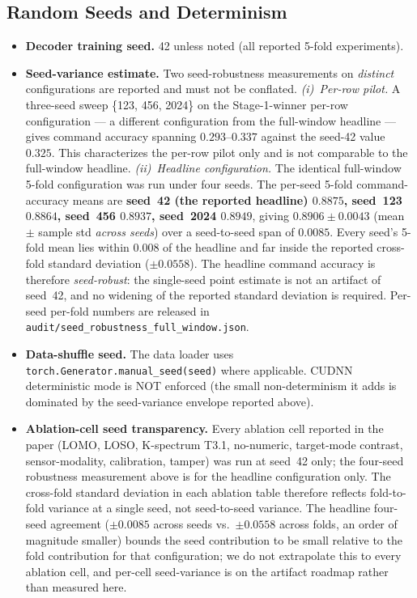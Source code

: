 \subsection{Random Seeds and Determinism}
\label{app:repl-seeds}

\begin{itemize}
\item \textbf{Decoder training seed.} 42 unless noted (all reported
5-fold experiments).
\item \textbf{Seed-variance estimate.} Two seed-robustness measurements
on \emph{distinct} configurations are reported and must not be
conflated. \emph{(i)~Per-row pilot.} A three-seed sweep \{123, 456,
2024\} on the Stage-1-winner per-row configuration --- a different
configuration from the full-window headline --- gives command accuracy
spanning $0.293$--$0.337$ against the seed-42 value $0.325$. This
characterizes the per-row pilot only and is not comparable to the
full-window headline. \emph{(ii)~Headline configuration.} The identical
full-window 5-fold configuration was run under four seeds. The per-seed
5-fold command-accuracy means are \textbf{seed~42 (the reported
headline) $0.8875$, seed~123 $0.8864$, seed~456 $0.8937$, seed~2024
$0.8949$}, giving $0.8906 \pm 0.0043$ (mean $\pm$ sample std
\emph{across seeds}) over a seed-to-seed span of $0.0085$. Every seed's
5-fold mean lies within $0.008$ of the headline and far inside the
reported cross-fold standard deviation ($\pm 0.0558$). The headline
command accuracy is therefore \emph{seed-robust}: the single-seed point
estimate is not an artifact of seed~42, and no widening of the reported
standard deviation is required. Per-seed per-fold numbers are released
in \texttt{audit/\allowbreak seed\_robustness\_full\_window.json}.
\item \textbf{Data-shuffle seed.} The data loader uses
\texttt{torch.Generator.manual\_seed(seed)} where applicable. CUDNN
deterministic mode is NOT enforced (the small non-determinism it adds
is dominated by the seed-variance envelope reported above).
\item \textbf{Ablation-cell seed transparency.} Every ablation cell
reported in the paper (LOMO, LOSO, K-spectrum T3.1, no-numeric,
target-mode contrast, sensor-modality, calibration, tamper) was run at
seed~42 only; the four-seed robustness measurement above is for the
headline configuration only. The cross-fold standard deviation in each
ablation table therefore reflects fold-to-fold variance at a single
seed, not seed-to-seed variance. The headline four-seed agreement
($\pm 0.0085$ across seeds vs.\ $\pm 0.0558$ across folds, an order of
magnitude smaller) bounds the seed contribution to be small relative to
the fold contribution for that configuration; we do not extrapolate
this to every ablation cell, and per-cell seed-variance is on the
artifact roadmap rather than measured here.
\end{itemize}

